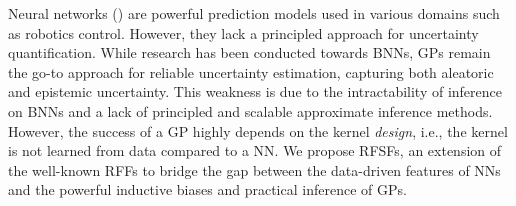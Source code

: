 Neural networks () are powerful prediction models used in various domains such as robotics control.
However, they lack a principled approach for uncertainty quantification.
While research has been conducted towards \acp{BNN}, \acp{GP} remain the go-to approach for reliable uncertainty estimation, capturing both aleatoric and epistemic uncertainty.
This weakness is due to the intractability of inference on \acp{BNN} and a lack of principled and scalable approximate inference methods.
However, the success of a \ac{GP} highly depends on the kernel \emph{design}, i.e., the kernel is not learned from data compared to a \ac{NN}.
We propose \acp{RFSF}, an extension of the well-known \acp{RFF} to bridge the gap between the data-driven features of \acp{NN} and the powerful inductive biases and practical inference of \acp{GP}.
